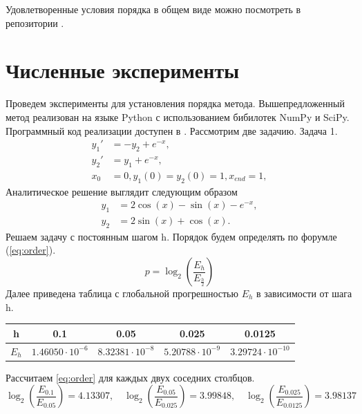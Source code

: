 \documentclass[a4paper,article,14pt]{extarticle}
\begin{document}
Удовлетворенные условия порядка в общем виде можно посмотреть в репозитории \cite{code}.
\pagebreak

\section{Численные эксперименты}\label{numeric}
Проведем эксперименты для установления порядка метода. Вышепредложенный метод реализован на языке Python с использованием бибилотек NumPy и SciPy. Программный код реализации доступен в \cite{code}. Рассмотрим две задачию. \newline
Задача 1.
\begin{equation}
\begin{aligned}
    y_{1}' &= -y_{2} + e^{-x}, \\
    y_{2}' &= y_{1} + e^{-x}, \\
    x_{0} &= 0, y_{1}(0) = y_{2}(0) = 1, x_{end} = 1,
\end{aligned}
\end{equation}
Аналитическое решение выглядит следующим образом
\begin{equation}
\begin{aligned}
    y_{1} &= 2 \cos(x) - \sin(x) - e^{-x}, \\
    y_{2} &= 2 \sin(x) + \cos(x).
\end{aligned}
\end{equation}
Решаем задачу с постоянным шагом h. Порядок будем определять по форумле (\ref{eq:order}).
\begin{equation}
p = \log_{2}(\frac{E_{h}}{E_{\frac{h}{2}}})
\label{eq:order}
\end{equation}
Далее приведена таблица с глобальной прогрешностью $E_{h}$ в зависимости от шага h. 
\begin{center}
\begin{tabular}{ |c|c|c|c|c| } 
\hline
h & 0.1& 0.05 & 0.025 & 0.0125 \\ 
\hline
$E_{h}$ & $1.46050\cdot10^{-6}$ & $8.32381\cdot10^{-8}$ & $5.20788\cdot10^{-9}$ & $3.29724\cdot10^{-10}$ \\ 
\hline
\end{tabular}
\end{center}
Рассчитаем \ref{eq:order} для каждых двух соседних столбцов.
\begin{equation}
\log_{2}(\frac{E_{0.1}}{E_{0.05}}) = 4.13307, \quad \log_{2}(\frac{E_{0.05}}{E_{0.025}}) = 3.99848 , \quad \log_{2}(\frac{E_{0.025}}{E_{0.0125}}) = 3.98137
\end{equation}
\end{document}
